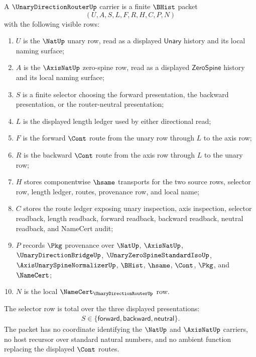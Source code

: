 \begin{definition}
\label{def:unary-direction-router-carrier}
A $\UnaryDirectionRouterUp$ carrier is a finite $\BHist$ packet
$$
(U,A,S,L,F,R,H,C,P,N)
$$
with the following visible rows:
\begin{enumerate}
\item $U$ is the $\NatUp$ unary row, read as a displayed $\mathsf{Unary}$ history and its local naming surface;
\item $A$ is the $\AxisNatUp$ zero-spine row, read as a displayed $\mathsf{ZeroSpine}$ history and its local naming surface;
\item $S$ is a finite selector choosing the forward presentation, the backward presentation, or the router-neutral presentation;
\item $L$ is the displayed length ledger used by either directional read;
\item $F$ is the forward $\Cont$ route from the unary row through $L$ to the axis row;
\item $R$ is the backward $\Cont$ route from the axis row through $L$ to the unary row;
\item $H$ stores componentwise $\hsame$ transports for the two source rows, selector row, length ledger, routes, provenance row, and local name;
\item $C$ stores the route ledger exposing unary inspection, axis inspection, selector readback, length readback, forward readback, backward readback, neutral readback, and NameCert audit;
\item $P$ records $\Pkg$ provenance over $\NatUp$, $\AxisNatUp$, $\UnaryDirectionBridgeUp$, $\UnaryZeroSpineStandardIsoUp$, $\AxisUnarySpineNormalizerUp$, $\BHist$, $\hsame$, $\Cont$, $\Pkg$, and $\NameCert$;
\item $N$ is the local $\NameCert_{\UnaryDirectionRouterUp}$ row.
\end{enumerate}
The selector row is total over the three displayed presentations:
$$
\begin{gathered}
S \in \{\mathsf{forward},\mathsf{backward},\mathsf{neutral}\}.
\end{gathered}
$$
The packet has no coordinate identifying the $\NatUp$ and $\AxisNatUp$ carriers, no host recursor over standard natural numbers, and no ambient function replacing the displayed $\Cont$ routes.
\end{definition}

